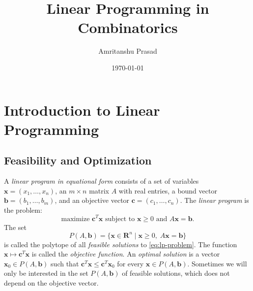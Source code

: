 \documentclass{amsbook}
\newcommand{\xx}{\mathbf x}
\newcommand{\cc}{\mathbf c}
\newcommand{\bb}{\mathbf b}
\newcommand{\RR}{\mathbf R}
\theoremstyle{definition}
\theoremstyle{remark}
\begin{document}
\title{Linear Programming in Combinatorics}
\author{Amritanshu Prasad}
\address{The Institute of Mathematical Sciences, Chennai.}
\address{Homi Bhabha National Institute, Mumbai.}
\date{\today}
\maketitle
\chapter{Introduction to Linear Programming}
\label{cha:intro-lp}
\section{Feasibility and Optimization}
\label{sec:feas-opt}
A \emph{linear program in equational form} consists of a set of variables $\xx=(x_1,\dotsc,x_n)$, an $m\times n$ matrix $A$ with real entries, a bound vector $\bb=(b_1,\dotsc,b_m)$, and an objective vector $\cc = (c_1,\dotsc,c_n)$.
The \emph{linear program} is the problem:
\begin{equation}
  \tag{LP}
  \label{eq:lp-problem}
  \text{maximize $\cc^T\xx$ subject to $\xx\geq 0$ and $A\xx=\bb$}.
\end{equation}
The set
\begin{displaymath}
  P(A,\bb) = \{\xx\in \RR^n\mid \xx\geq 0,\;A\xx=\bb\}
\end{displaymath}
is called the polytope of all \emph{feasible solutions} to \eqref{eq:lp-problem}.
The function $\xx\mapsto \cc^T\xx$ is called the \emph{objective function}.
An \emph{optimal solution} is a vector $\xx_0\in P(A,\bb)$ such that $\cc^T\xx\leq \cc^T\xx_0$ for every $\xx\in P(A,\bb)$.
Sometimes we will only be interested in the set $P(A,\bb)$ of feasible solutions, which does not depend on the objective vector.
\end{document}
